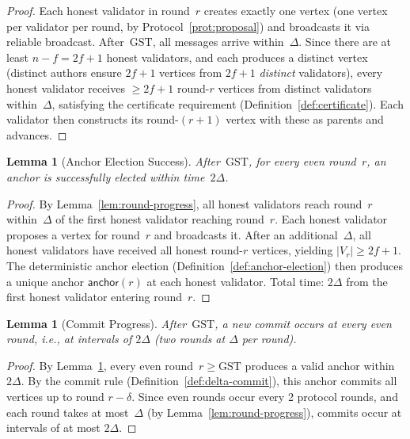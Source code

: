 \documentclass[11pt,a4paper]{article}
\newtheorem{lemma}[theorem]{Lemma}
\theoremstyle{definition}
\theoremstyle{remark}
\newcommand{\GST}{\mathrm{GST}}
\newcommand{\anchor}{\mathsf{anchor}}
\begin{document}
\begin{proof}
Each honest validator in round~$r$ creates exactly one vertex
(one vertex per validator per round, by Protocol~\ref{prot:proposal})
and broadcasts it via reliable broadcast.
After~$\GST$, all messages arrive within~$\Delta$.
Since there are at least $n - f = 2f+1$ honest validators, and each
produces a distinct vertex (distinct authors ensure $2f+1$ vertices from
$2f+1$ \emph{distinct} validators), every honest validator receives
$\geq 2f+1$ round-$r$ vertices from distinct validators within~$\Delta$,
satisfying the certificate requirement
(Definition~\ref{def:certificate}).
Each validator then constructs its round-$(r\!+\!1)$ vertex with these
as parents and advances.
\end{proof}

\begin{lemma}[Anchor Election Success]\label{lem:anchor-success}
After~$\GST$, for every even round~$r$, an anchor is successfully
elected within time~$2\Delta$.
\end{lemma}

\begin{proof}
By Lemma~\ref{lem:round-progress}, all honest validators reach round~$r$
within~$\Delta$ of the first honest validator reaching round~$r$.
Each honest validator proposes a vertex for round~$r$ and broadcasts it.
After an additional~$\Delta$, all honest validators have received all
honest round-$r$ vertices, yielding $|V_r| \geq 2f+1$.
The deterministic anchor election (Definition~\ref{def:anchor-election})
then produces a unique anchor $\anchor(r)$ at each honest validator.
Total time: $2\Delta$ from the first honest validator entering round~$r$.
\end{proof}

\begin{lemma}[Commit Progress]\label{lem:commit-progress}
After~$\GST$, a new commit occurs at every even round, i.e., at
intervals of $2\Delta$ (two rounds at $\Delta$ per round).
\end{lemma}

\begin{proof}
By Lemma~\ref{lem:anchor-success}, every even round~$r \geq \GST$
produces a valid anchor within~$2\Delta$.
By the commit rule (Definition~\ref{def:delta-commit}), this anchor
commits all vertices up to round $r - \delta$.
Since even rounds occur every 2 protocol rounds, and each round takes
at most~$\Delta$ (by Lemma~\ref{lem:round-progress}), commits occur
at intervals of at most $2\Delta$.
\end{proof}
\end{document}
